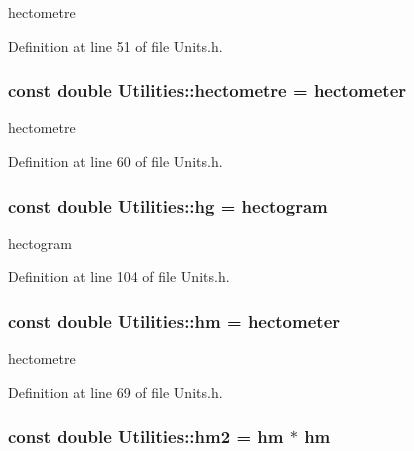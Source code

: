 hectometre 



Definition at line 51 of file Units.h.

\hypertarget{namespace_utilities_ac838a64f1022b1f9cb88f0f641ee26b1}{
\subsubsection[{hectometre}]{\setlength{\rightskip}{0pt plus 5cm}const double {\bf Utilities::hectometre} = {\bf hectometer}}}
\label{namespace_utilities_ac838a64f1022b1f9cb88f0f641ee26b1}


hectometre 



Definition at line 60 of file Units.h.

\hypertarget{namespace_utilities_afce1fbb55c72d2f7670158b228e6be92}{
\subsubsection[{hg}]{\setlength{\rightskip}{0pt plus 5cm}const double {\bf Utilities::hg} = {\bf hectogram}}}
\label{namespace_utilities_afce1fbb55c72d2f7670158b228e6be92}


hectogram 



Definition at line 104 of file Units.h.

\hypertarget{namespace_utilities_aacdd5d6ef494c74b5292a3966a1bd5e7}{
\subsubsection[{hm}]{\setlength{\rightskip}{0pt plus 5cm}const double {\bf Utilities::hm} = {\bf hectometer}}}
\label{namespace_utilities_aacdd5d6ef494c74b5292a3966a1bd5e7}


hectometre 



Definition at line 69 of file Units.h.

\hypertarget{namespace_utilities_a437509ab345193dd1d6d41934f7ff284}{
\subsubsection[{hm2}]{\setlength{\rightskip}{0pt plus 5cm}const double {\bf Utilities::hm2} = {\bf hm} $\ast$ {\bf hm}}}
\label{namespace_utilities_a437509ab345193dd1d6d41934f7ff284}


